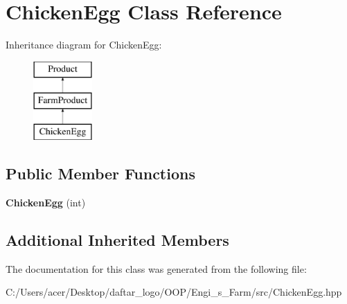 \hypertarget{class_chicken_egg}{}\section{Chicken\+Egg Class Reference}
\label{class_chicken_egg}
Inheritance diagram for Chicken\+Egg\+:\begin{figure}[H]
\begin{center}
\leavevmode
\includegraphics[height=3.000000cm]{class_chicken_egg}
\end{center}
\end{figure}
\subsection*{Public Member Functions}
\begin{DoxyCompactItemize}
\item 
\mbox{\label{class_chicken_egg_a6c8da6e4ef508960cccef7ba4e89f788}} 
{\bfseries Chicken\+Egg} (int)
\end{DoxyCompactItemize}
\subsection*{Additional Inherited Members}


The documentation for this class was generated from the following file\+:\begin{DoxyCompactItemize}
\item 
C\+:/\+Users/acer/\+Desktop/daftar\+\_\+logo/\+O\+O\+P/\+Engi\+\_\+s\+\_\+\+Farm/src/Chicken\+Egg.\+hpp\end{DoxyCompactItemize}
